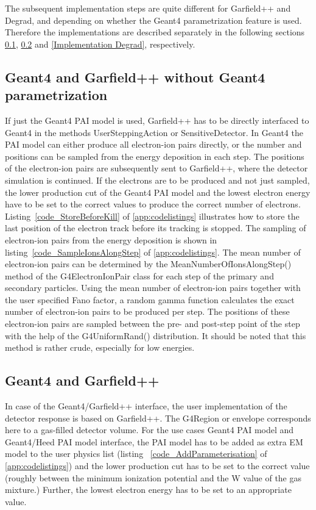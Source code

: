 \documentclass[preprint,12pt,sort&compress]{elsarticle}
\begin{document}
The subsequent implementation steps are quite different for Garfield++ and Degrad, and depending on whether the Geant4 parametrization feature is used. Therefore the implementations are described separately in the following sections \ref{Geant4 and Garfield++ without Geant4 parametrization}, \ref{Implementation Garfield++} and \ref{Implementation Degrad}, respectively.

\subsection{Geant4 and Garfield++ without Geant4 parametrization}\label{Geant4 and Garfield++ without Geant4 parametrization}
If just the Geant4 PAI model is used, Garfield++ has to be directly interfaced to Geant4 in the methods UserSteppingAction or SensitiveDetector. In Geant4 the PAI model can either produce all electron-ion pairs directly, or the number and positions can be sampled from the energy deposition in each step.
The positions of the electron-ion pairs are subsequently sent to Garfield++, where the detector simulation is continued. If the electrons are to be produced and not just sampled, the lower production cut of the Geant4 PAI model and the lowest electron energy have to be set to the correct values to produce the correct number of electrons. Listing~\ref{code_StoreBeforeKill} of \ref{app:codelistings} illustrates how to store the last position of the electron track before its tracking is stopped. The sampling of electron-ion pairs from the energy deposition is shown in listing~\ref{code_SampleIonsAlongStep} of \ref{app:codelistings}. The mean number of electron-ion pairs can be determined by the MeanNumberOfIonsAlongStep() method of the G4ElectronIonPair class for each step of the primary and secondary particles. Using the mean number of electron-ion pairs together with the user specified Fano factor, a random gamma function calculates the exact number of electron-ion pairs to be produced per step. The positions of these electron-ion pairs are sampled between the pre- and post-step point of the step with the help of the G4UniformRand() distribution. It should be noted that this method is rather crude, especially for low energies.


\subsection{Geant4 and Garfield++}\label{Implementation Garfield++}
In case of the Geant4/Garfield++ interface, the user implementation of the detector response is based on Garfield++. The G4Region or envelope corresponds here to a gas-filled detector volume. For the use cases Geant4 PAI model and Geant4/Heed PAI model interface, the PAI model has to be added as extra EM model to the user physics list (listing ~\ref{code_AddParameterisation} of \ref{app:codelistings}) and the lower production cut has to be set to the correct value (roughly between the minimum ionization potential and the W value of the gas mixture.) Further, the lowest electron energy has to be set to an appropriate value. 
\end{document}
